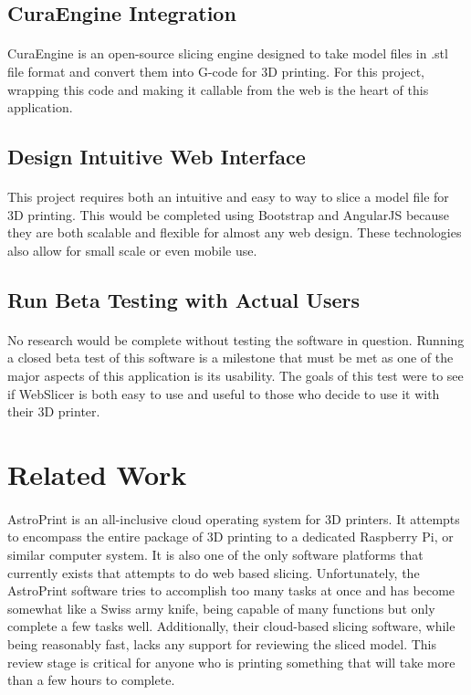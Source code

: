 \subsection{CuraEngine Integration}
\paragraph{}
CuraEngine is an open-source slicing engine designed to take model files in .stl file format and convert them into G-code for 3D printing.
For this project, wrapping this code and making it callable from the web is the heart of this application.

\subsection{Design Intuitive Web Interface}
\paragraph{}
This project requires both an intuitive and easy to way to slice a model file for 3D printing.
This would be completed using Bootstrap and AngularJS because they are both scalable and flexible for almost any web design.
These technologies also allow for small scale or even mobile use.

\subsection{Run Beta Testing with Actual Users}
\paragraph{}
No research would be complete without testing the software in question.
Running a closed beta test of this software is a milestone that must be met as one of the major aspects of this application is its usability.
The goals of this test were to see if WebSlicer is both easy to use and useful to those who decide to use it with their 3D printer.

\section{Related Work}
\paragraph{}
AstroPrint is an all-inclusive cloud operating system for 3D printers.
It attempts to encompass the entire package of 3D printing to a dedicated Raspberry Pi, or similar computer system.
It is also one of the only software platforms that currently exists that attempts to do web based slicing.
Unfortunately, the AstroPrint software tries to accomplish too many tasks at once and has become somewhat like a Swiss army knife, being capable of many functions but only complete a few tasks well.
Additionally, their cloud-based slicing software, while being reasonably fast, lacks any support for reviewing the sliced model.
This review stage is critical for anyone who is printing something that will take more than a few hours to complete.

